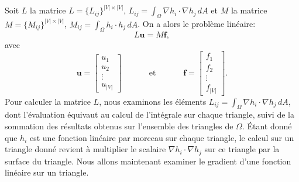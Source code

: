 Soit \(L\) la matrice \(L = \{L_{ij}\}^{|V|\times|V|}\), \(L_{ij} = \displaystyle\int_{\Omega} \nabla h_i \cdot \nabla h_j \,dA\) et \(M\) la matrice \(M = \{M_{ij}\}^{|V|\times|V|}\), \(M_{ij} = \displaystyle\int_{\Omega} h_i \cdot h_j \,dA\). On a alors le problème linéaire:
$$
L\mathbf{u}=M\mathbf{f},
$$
avec
\[
\mathbf{u}=\begin{bmatrix}
u_1\\
u_2\\
\vdots \\
u_{|V|}
\end{bmatrix}
\quad\quad\quad\mbox{ et }\quad\quad\quad
\mathbf{f}=
\begin{bmatrix}
f_1\\
f_2\\
\vdots \\
f_{|V|}
\end{bmatrix}.
\]
Pour calculer la matrice \(L\), nous examinons les éléments \(L_{ij} = \displaystyle\int_{\Omega} \nabla h_i \cdot \nabla h_j \,dA\), dont l'évaluation équivaut au calcul de l'intégrale sur chaque triangle, suivi de la sommation des résultats obtenus sur l'ensemble des triangles de \(\Omega\). Étant donné que \(h_i\) est une fonction linéaire par morceau sur chaque triangle, le calcul sur un triangle donné revient à multiplier le scalaire \(\nabla h_i \cdot \nabla h_j\) sur ce triangle par la surface du triangle. Nous allons maintenant examiner le gradient d'une fonction linéaire sur un triangle.

